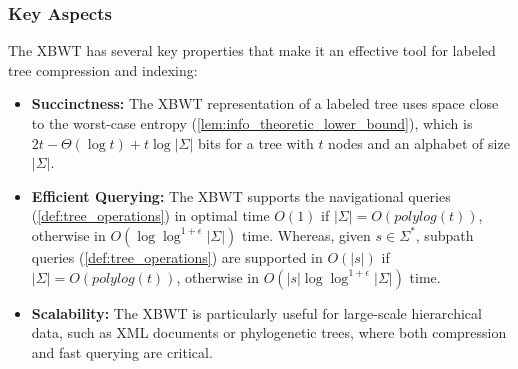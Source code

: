 \subsubsection{Key Aspects}
The XBWT has several key properties that make it an effective tool for labeled tree compression and indexing:
\begin{itemize}
    \item \textbf{Succinctness:} The XBWT representation of a labeled tree uses space close to the worst-case entropy (\cref{lem:info_theoretic_lower_bound}), which is \( 2t - \Theta(\log t) + t \log |\Sigma| \) bits for a tree with $t$ nodes and an alphabet of size $|\Sigma|$.
    \item \textbf{Efficient Querying:} The XBWT supports the navigational queries (\cref{def:tree_operations}) in optimal time $O(1)$ if $|\Sigma| = O(polylog(t))$, otherwise in $O(\log\log^{1+\epsilon} |\Sigma|)$ time. Whereas, given $s \in \Sigma^*$, subpath queries (\cref{def:tree_operations}) are supported in $O(|s|)$ if $|\Sigma| = O(polylog(t))$, otherwise in $O(|s| \log\log^{1+\epsilon} |\Sigma|)$ time.
    \item \textbf{Scalability:} The XBWT is particularly useful for large-scale hierarchical data, such as XML documents or phylogenetic trees, where both compression and fast querying are critical.
\end{itemize}

